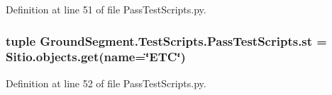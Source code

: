 Definition at line 51 of file Pass\+Test\+Scripts.\+py.

\hypertarget{namespace_ground_segment_1_1_test_scripts_1_1_pass_test_scripts_a5f5777af78deaca7195ed9bbe9f2bc21}{}
\subsubsection[{st}]{\setlength{\rightskip}{0pt plus 5cm}tuple Ground\+Segment.\+Test\+Scripts.\+Pass\+Test\+Scripts.\+st = Sitio.\+objects.\+get(name=\char`\"{}E\+T\+C\char`\"{})}\label{namespace_ground_segment_1_1_test_scripts_1_1_pass_test_scripts_a5f5777af78deaca7195ed9bbe9f2bc21}


Definition at line 52 of file Pass\+Test\+Scripts.\+py.

